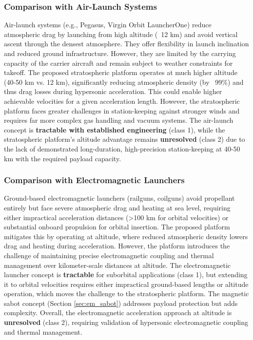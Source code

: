 \subsubsection{Comparison with Air-Launch Systems}
Air-launch systems (e.g., Pegasus, Virgin Orbit LauncherOne) reduce atmospheric drag by launching from high altitude (~12 km) and avoid vertical ascent through the densest atmosphere. They offer flexibility in launch inclination and reduced ground infrastructure. However, they are limited by the carrying capacity of the carrier aircraft and remain subject to weather constraints for takeoff. The proposed stratospheric platform operates at much higher altitude (40-50 km vs. 12 km), significantly reducing atmospheric density (by ~99\%) and thus drag losses during hypersonic acceleration. This could enable higher achievable velocities for a given acceleration length. However, the stratospheric platform faces greater challenges in station-keeping against stronger winds and requires far more complex gas handling and vacuum systems. The air-launch concept is \textbf{tractable with established engineering} (class 1), while the stratospheric platform's altitude advantage remains \textbf{unresolved} (class 2) due to the lack of demonstrated long-duration, high-precision station-keeping at 40-50 km with the required payload capacity.

\subsubsection{Comparison with Electromagnetic Launchers}
Ground-based electromagnetic launchers (railguns, coilguns) avoid propellant entirely but face severe atmospheric drag and heating at sea level, requiring either impractical acceleration distances (>100 km for orbital velocities) or substantial onboard propulsion for orbital insertion. The proposed platform mitigates this by operating at altitude, where reduced atmospheric density lowers drag and heating during acceleration. However, the platform introduces the challenge of maintaining precise electromagnetic coupling and thermal management over kilometer-scale distances at altitude. The electromagnetic launcher concept is \textbf{tractable} for suborbital applications (class 1), but extending it to orbital velocities requires either impractical ground-based lengths or altitude operation, which moves the challenge to the stratospheric platform. The magnetic sabot concept (Section \ref{sec:em_sabot}) addresses payload protection but adds complexity. Overall, the electromagnetic acceleration approach at altitude is \textbf{unresolved} (class 2), requiring validation of hypersonic electromagnetic coupling and thermal management.

